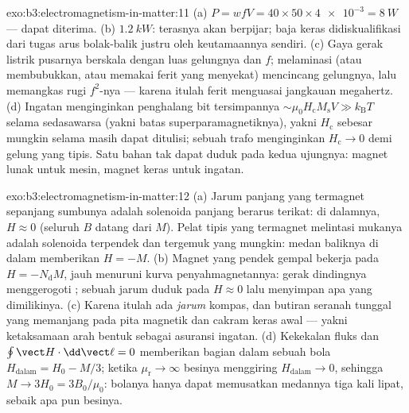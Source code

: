 \begin{solution}{exo:b3:electromagnetism-in-matter:11}
(a) $P = wfV = 40\times50\times\num{4e-3} = \qty{8}{W}$ ---
dapat diterima. (b) $\qty{1.2}{kW}$: terasnya akan berpijar; baja keras
didiskualifikasi dari tugas arus bolak-balik justru oleh keutamaannya sendiri. (c) Gaya gerak
listrik pusarnya berskala dengan luas gelungnya dan $f$; melaminasi (atau
membubukkan, atau memakai ferit yang menyekat) mencincang gelungnya, lalu
memangkas rugi $f^2$-nya --- karena itulah ferit menguasai jangkauan
megahertz. (d) Ingatan menginginkan
penghalang bit tersimpannya $\sim\mu_0H_{\text{c}}M_{\text{s}}V \gg
k_{\text{B}}T$ selama sedasawarsa (yakni batas superparamagnetiknya), yakni
$H_{\text{c}}$ sebesar mungkin selama masih dapat ditulisi; sebuah trafo menginginkan
$H_{\text{c}} \to 0$ demi gelung yang tipis. Satu bahan tak dapat duduk pada
kedua ujungnya: magnet lunak untuk mesin, magnet keras untuk ingatan.
\end{solution}

\begin{solution}{exo:b3:electromagnetism-in-matter:12}
(a) Jarum panjang yang termagnet sepanjang sumbunya adalah solenoida panjang
berarus terikat: di dalamnya, $H \approx 0$ (seluruh $B$ datang dari $M$). Pelat tipis
yang termagnet melintasi mukanya adalah solenoida terpendek dan tergemuk
yang mungkin: medan baliknya di dalam memberikan $H = -M$. (b)
Magnet yang pendek gempal bekerja pada $H = -N_{\text{d}}M$, jauh menuruni
kurva penyahmagnetannya: gerak dindingnya menggerogoti ; sebuah
jarum duduk pada $H \approx 0$ lalu menyimpan apa yang dimilikinya. (c) Karena itulah ada
\emph{jarum} kompas, dan butiran seranah tunggal yang memanjang pada
pita magnetik dan cakram keras awal --- yakni ketaksamaan arah bentuk sebagai
asuransi ingatan. (d) Kekekalan fluks dan $\oint\vect H\cdot
\dd\vect\ell = 0$ memberikan bagian dalam sebuah bola $H_{\text{dalam}} =
H_0 - M/3$; ketika $\mu_{\text{r}}\to\infty$ besinya menggiring
$H_{\text{dalam}}\to0$, sehingga $M \to 3H_0 = 3B_0/\mu_0$: bolanya hanya dapat
memusatkan medannya tiga kali lipat, sebaik apa pun besinya.
\end{solution}

